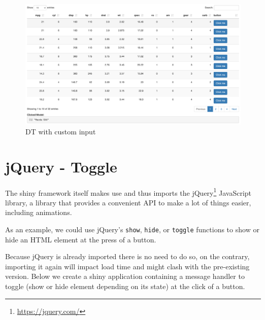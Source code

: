 \documentclass[
]{krantz}
\makeatletter
\newenvironment{Shaded}{\begin{snugshade}}{\end{snugshade}}
\newcommand{\AttributeTok}[1]{\textcolor[rgb]{0.61,0.61,0.61}{#1}}
\newcommand{\CommentTok}[1]{\textcolor[rgb]{0.37,0.37,0.37}{\textit{#1}}}
\newcommand{\NormalTok}[1]{#1}
\newcommand{\OperatorTok}[1]{\textcolor[rgb]{0.43,0.43,0.43}{\textbf{#1}}}
\newcommand{\StringTok}[1]{\textcolor[rgb]{0.5,0.5,0.5}{#1}}
\renewcommand{\href}[2]{#2\footnote{\url{#1}}}
\newenvironment{kframe}{%
\medskip{}
\setlength{\fboxsep}{.8em}
 \def\at@end@of@kframe{}%
 \ifinner\ifhmode%
  \def\at@end@of@kframe{\end{minipage}}%
  \begin{minipage}{\columnwidth}%
 \fi\fi%
 \def\FrameCommand##1{\hskip\@totalleftmargin \hskip-\fboxsep
 \colorbox{shadecolor}{##1}\hskip-\fboxsep
     \hskip-\linewidth \hskip-\@totalleftmargin \hskip\columnwidth}%
 \MakeFramed {\advance\hsize-\width
   \@totalleftmargin\z@ \linewidth\hsize
   \@setminipage}}%
 {\par\unskip\endMakeFramed%
 \at@end@of@kframe}
\renewenvironment{Shaded}{\begin{kframe}}{\end{kframe}}
\makeatother
\begin{document}
\begin{figure}
\centering
\includegraphics{images/dt-button.png}
\caption{DT with custom input}
\end{figure}

\hypertarget{jquery---toggle}{%
\section{jQuery - Toggle}\label{jquery---toggle}}

The shiny framework itself makes use and thus imports the \href{https://jquery.com/}{jQuery} JavaScript library, a library that provides a convenient API to make a lot of things easier, including animations.

As an example, we could use jQuery's \texttt{show}, \texttt{hide}, or \texttt{toggle} functions to show or hide an HTML element at the press of a button.

\begin{Shaded}
\end{Shaded}

Because jQuery is already imported there is no need to do so, on the contrary, importing it again will impact load time and might clash with the pre-existing version. Below we create a shiny application containing a message handler to toggle (show or hide element depending on its state) at the click of a button.
\end{document}
